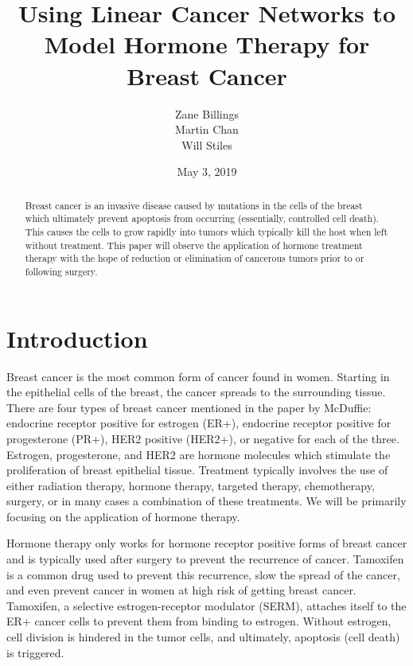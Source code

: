 \documentclass[12pt]{article}
\title{Using Linear Cancer Networks to Model Hormone Therapy for Breast Cancer}
\author{Zane Billings\\Martin Chan\\Will Stiles}
\date{May 3, 2019}
\begin{document}
\maketitle

\begin{abstract}
    \noindent Breast cancer is an invasive disease caused by mutations in the cells of the breast which ultimately prevent apoptosis from occurring (essentially, controlled cell death). This causes the cells to grow rapidly into tumors which typically kill the host when left without treatment.  This paper will observe the application of hormone treatment therapy with the hope of reduction or elimination of cancerous tumors prior to or following surgery.
\end{abstract}

\tableofcontents
\pagebreak

\section{Introduction}
\indent\indent Breast cancer is the most common form of cancer found in women. Starting in the epithelial cells of the breast, the cancer spreads to the surrounding tissue. There are four types of breast cancer mentioned in the paper by McDuffie: endocrine receptor positive for estrogen (ER+), endocrine receptor positive for progesterone (PR+), HER2 positive (HER2+), or negative for each of the three.  Estrogen, progesterone, and HER2 are hormone molecules which stimulate the proliferation of breast epithelial tissue. Treatment typically involves the use of either radiation therapy, hormone therapy, targeted therapy, chemotherapy, surgery, or in many cases a combination of these treatments.  We will be primarily focusing on the application of hormone therapy.

Hormone therapy only works for hormone receptor positive forms of breast cancer and is typically used after surgery to prevent the recurrence of cancer.  Tamoxifen is a common drug used to prevent this recurrence, slow the spread of the cancer, and even prevent cancer in women at high risk of getting breast cancer.  Tamoxifen, a selective estrogen-receptor modulator (SERM), attaches itself to the ER+ cancer cells to prevent them from binding to estrogen. Without estrogen, cell division is hindered in the tumor cells, and ultimately, apoptosis (cell death) is triggered.
\end{document}

